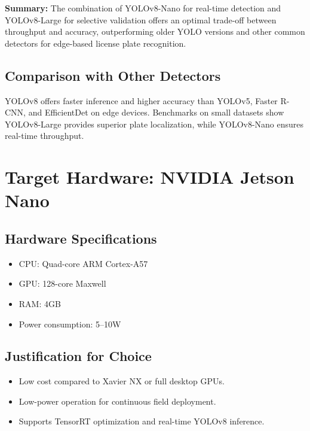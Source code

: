 	\textbf{Summary:} The combination of YOLOv8-Nano for real-time detection and YOLOv8-Large for selective validation offers an optimal trade-off between throughput and accuracy, outperforming older YOLO versions and other common detectors for edge-based license plate recognition.
		
	\subsection{Comparison with Other Detectors}
	YOLOv8 offers faster inference and higher accuracy than YOLOv5, Faster R-CNN, and EfficientDet on edge devices. Benchmarks on small datasets show YOLOv8-Large provides superior plate localization, while YOLOv8-Nano ensures real-time throughput.
	
	\section{Target Hardware: NVIDIA Jetson Nano}
	\subsection{Hardware Specifications}
	\begin{itemize}
		\item CPU: Quad-core ARM Cortex-A57
		\item GPU: 128-core Maxwell
		\item RAM: 4GB
		\item Power consumption: 5–10W
	\end{itemize}
	
	\subsection{Justification for Choice}
	\begin{itemize}
		\item Low cost compared to Xavier NX or full desktop GPUs.
		\item Low-power operation for continuous field deployment.
		\item Supports TensorRT optimization and real-time YOLOv8 inference.
	\end{itemize}
	
